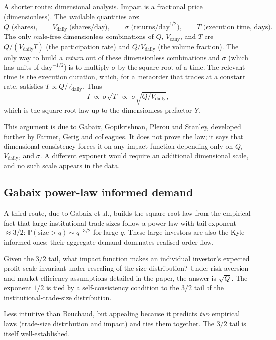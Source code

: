 A shorter route: dimensional analysis. Impact is a fractional price
(dimensionless). The available quantities are:
\[
  Q \text{ (shares)}, \qquad
  V_{\text{daily}} \text{ (shares/day)}, \qquad
  \sigma \text{ (returns/day}^{1/2}\text{)}, \qquad
  T \text{ (execution time, days)}.
\]
The only scale-free dimensionless combinations of $Q$, $V_{\text{daily}}$,
and $T$ are $Q/(V_{\text{daily}} T)$ (the participation rate) and
$Q/V_{\text{daily}}$ (the volume fraction). The only way to build a
\emph{return} out of these dimensionless combinations and $\sigma$
(which has units of $\text{day}^{-1/2}$) is to multiply $\sigma$ by
the square root of a time. The relevant time is the execution
duration, which, for a metaorder that trades at a constant rate,
satisfies $T \propto Q/V_{\text{daily}}$. Thus
\[
  I \;\propto\; \sigma \sqrt{T}
  \;\propto\; \sigma \sqrt{Q/V_{\text{daily}}},
\]
which is the square-root law up to the dimensionless prefactor $Y$.

This argument is due to Gabaix, Gopikrishnan, Plerou and Stanley,
developed further by Farmer, Gerig and colleagues. It does not prove
the law; it says that dimensional consistency forces it on any
impact function depending only on $Q$, $V_{\text{daily}}$, and
$\sigma$. A different exponent would require an additional
dimensional scale, and no such scale appears in the data.

\subsection{Gabaix power-law informed demand}
\label{subsec:gabaix_powerlaw}

A third route, due to Gabaix et al., builds the square-root law from
the empirical fact that large institutional trade sizes follow a
power law with tail exponent $\approx 3/2$: $\mathbb{P}(\text{size} >
q) \sim q^{-3/2}$ for large $q$. These large investors are also the
Kyle-informed ones; their aggregate demand dominates realised order
flow.

Given the $3/2$ tail, what impact function makes an individual
investor's expected profit scale-invariant under rescaling of the
size distribution? Under risk-aversion and market-efficiency
assumptions detailed in the paper, the answer is $\sqrt{Q}$. The
exponent $1/2$ is tied by a self-consistency condition to the $3/2$
tail of the institutional-trade-size distribution.

Less intuitive than Bouchaud, but appealing because it predicts
\emph{two} empirical laws (trade-size distribution and impact) and
ties them together. The $3/2$ tail is itself well-established.

